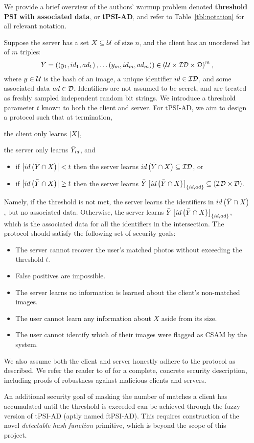 We provide a brief overview of the authors' warmup problem denoted \textbf{threshold PSI with associated data}, or \textbf{tPSI-AD}, and refer to Table~\ref{tbl:notation} for all relevant notation.

Suppose the server has a set $X \subseteq \mathcal{U}$ of size $n$, and the client has an unordered list of $m$ triples:
\begin{align*}
      \bar{Y} = \left(\left(y_1, id_1, ad_1\right) , \dots   \left(y_m, id_m, ad_m\right)\right) \in \left(\mathcal{U} \times \mathcal{ID} \times \mathcal{D}\right)^m,
\end{align*}
where $y \in \mathcal{U}$ is the hash of an image, a unique identifier $id \in \mathcal{ID}$, and some associated data $ad \in \mathcal{D}$. Identifiers are not assumed to be secret, and are treated as freshly sampled independent random bit strings. We introduce a threshold parameter $t$ known to both the client and server.  For tPSI-AD, we aim to design a protocol such that at termination, \begin{enumerate*}[label=(\roman*)]
	\item the client only learns $\left\lvert X\right\rvert$, 
	\item the server only learns $\bar{Y}_{id}$, and
\end{enumerate*}
\begin{itemize}
	\item if $\left\lvert id \left(\bar{Y} \cap X\right)\right\rvert < t$ then the server learns $id \left(\bar{Y} \cap X\right) \subseteq \mathcal{ID}$, or
	\item if $\left\lvert id \left(\bar{Y} \cap X\right)\right\rvert \geq t$ then the server learns $\bar{Y}\left[id \left(\bar{Y} \cap X\right)\right]_{\left\{id,ad\right\}} \subseteq \left(\mathcal{ID} \times \mathcal{D}\right) $.
\end{itemize}
Namely, if the threshold is not met, the server learns the identifiers in $id \left(\bar{Y} \cap X\right)$, but no associated data. Otherwise, the server learns $\bar{Y}\left[id \left(\bar{Y} \cap X\right)\right]_{\left\{id,ad\right\}}$, which is the associated data for all the identifiers in the intersection. The protocol should satisfy the following set of security goals:
  \begin{itemize}
    \item The server cannot recover the user's matched photos without exceeding the threshold $t$.
    \item False positives are impossible.
    \item The server learns no information is learned about the client's non-matched images.
    \item The user cannot learn any information about $X$ aside from its size.
    \item The user cannot identify which of their images were flagged as CSAM by the system.
\end{itemize}
We also assume both the client and server honestly adhere to the protocol as described. We refer the reader to  of \cite{bhowmick2021apple} for a complete, concrete security description, including proofs of robustness against malicious clients and servers.


An additional security goal of masking the number of matches a client has accumulated until the threshold is exceeded can be achieved through the fuzzy version of tPSI-AD (aptly named ftPSI-AD). This requires construction of the novel \emph{detectable hash function} primitive, which is beyond the scope of this project.